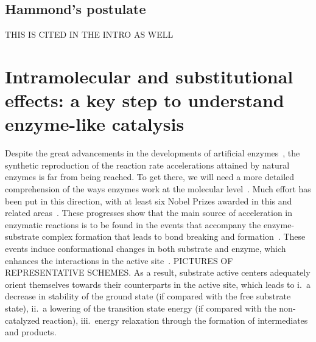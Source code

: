 \subsection{Hammond's postulate}

THIS IS CITED IN THE INTRO AS WELL


\section{Intramolecular and substitutional effects:
  a key step to understand enzyme-like catalysis}

Despite the great advancements in the developments of artificial enzymes~\cite{Breslow_1995},
the synthetic reproduction of the reaction rate accelerations attained by
natural enzymes is far from being reached.
To get there,
we will need a more detailed comprehension of the ways enzymes
work at the molecular level~\cite{Catalysis_in_Chemistry_and_Enzymology}.
Much effort has been put in this direction,
with at least six Nobel Prizes
awarded in this and related areas~\cite{Nobel_1929,Nobel_1946,Nobel_1957,Nobel_1975,Nobel_1997,Nobel_2013}.
These progresses show that the main source of acceleration in
enzymatic reactions is to be found in the events that accompany the
enzyme-substrate complex formation that leads to bond breaking and
formation~\cite{Catalysis_in_Chemistry_and_Enzymology}.
These events induce conformational changes in both substrate and enzyme,
which
enhances the interactions in the active site~\cite{Fischer_1890,Fischer_1894,Koshland_1958,Dafforn_1971,Kirby_1996}.
PICTURES OF REPRESENTATIVE SCHEMES.\@
As a result,
substrate active centers adequately orient themselves towards
their counterparts in the active site,
which leads to
i.\ a decrease in stability of the ground state (if compared with the
free substrate state),
ii.\ a lowering of the transition state energy (if compared with the
non-catalyzed reaction),
iii.\ energy relaxation through the formation of intermediates and
products.

